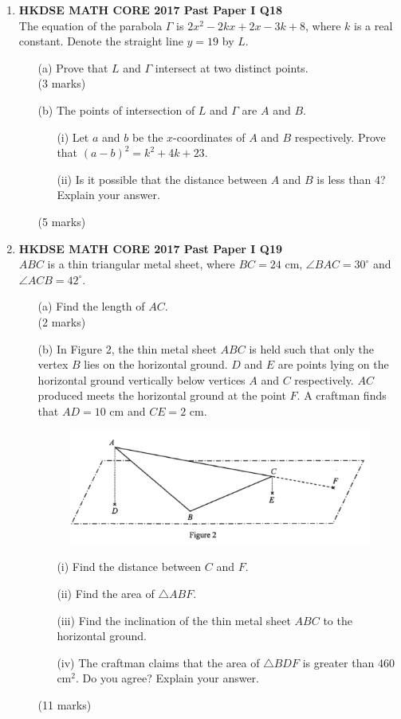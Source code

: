\documentclass[12pt]{article}
\begin{document}
\begin{enumerate}
	\item \textbf{HKDSE MATH CORE 2017 Past Paper I Q18}\\
	The equation of the parabola $\Gamma$ is $2x^2 - 2kx + 2x - 3k + 8$, where $k$ is a real constant. Denote the straight line $y = 19$ by $L$.
	\begin{enumerate}
		\item[(a)] Prove that $L$ and $\Gamma$ intersect at two distinct points. \\(3 marks)
		\item[(b)] The points of intersection of $L$ and $\Gamma$ are $A$ and $B$.
		\begin{enumerate}
			\item[(i)] Let $a$ and $b$ be the $x$-coordinates of $A$ and $B$ respectively. Prove that $(a - b)^2 = k^2 + 4k + 23$.
			\item[(ii)] Is it possible that the distance between $A$ and $B$ is less than 4? Explain your answer.
		\end{enumerate}
		(5 marks)
	\end{enumerate}

	\item \textbf{HKDSE MATH CORE 2017 Past Paper I Q19}\\
	$ABC$ is a thin triangular metal sheet, where $BC = 24$ cm, $\angle BAC = 30^\circ$ and $\angle ACB = 42^\circ$.	
	\begin{enumerate}
		\item[(a)] Find the length of $AC$. \\(2 marks)
		\item[(b)] In Figure 2, the thin metal sheet $ABC$ is held such that only the vertex $B$ lies on the horizontal ground. $D$ and $E$ are points lying on the horizontal ground vertically below vertices $A$ and $C$ respectively. $AC$ produced meets the horizontal ground at the point $F$. A craftman finds that $AD = 10$ cm and $CE = 2$ cm.
		\begin{figure}[H]
			\centering
			\includegraphics[width = .3\linewidth]{2017Figure1.2}
		\end{figure}
		\begin{enumerate}
			\item[(i)] Find the distance between $C$ and $F$.
			\item[(ii)] Find the area of $\triangle ABF$.
			\item[(iii)] Find the inclination of the thin metal sheet $ABC$ to the horizontal ground.
			\item[(iv)] The craftman claims that the area of $\triangle BDF$ is greater than 460 cm$^2$. Do you agree? Explain your answer.
		\end{enumerate}
		(11 marks)
	\end{enumerate}


\end{enumerate}
\end{document}
